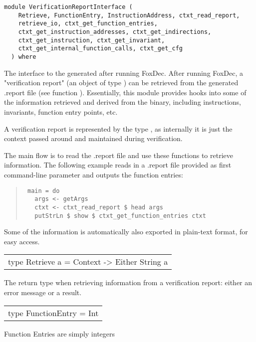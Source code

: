 \label{module:VerificationReportInterface}
\haddockbeginheader
{\haddockverb\begin{verbatim}
module VerificationReportInterface (
    Retrieve, FunctionEntry, InstructionAddress, ctxt_read_report,
    retrieve_io, ctxt_get_function_entries,
    ctxt_get_instruction_addresses, ctxt_get_indirections,
    ctxt_get_instruction, ctxt_get_invariant,
    ctxt_get_internal_function_calls, ctxt_get_cfg
  ) where\end{verbatim}}
\haddockendheader

The interface to the  generated after running FoxDec.
After running FoxDec, a "verification report" (an object of type ) can be retrieved from the generated .report file (see function ).
Essentially, this module provides hooks into some of the information retrieved and derived from the binary,
including instructions, invariants, function entry points, etc.\par
A verification report is represented by the type , as internally it
is just the context passed around and maintained during verification.\par
The main flow is to read the .report file and use these functions to retrieve information.
The following example reads in a .report file provided as first command-line parameter and outputs the function entries:\par
\begin{quote}
{\haddockverb\begin{verbatim}
 main = do
   args <- getArgs
   ctxt <- ctxt_read_report $ head args
   putStrLn $ show $ ctxt_get_function_entries ctxt\end{verbatim}}
\end{quote}
Some of the information is automatically also exported in plain-text format, for easy access.\par
\begin{haddockdesc}
\item[\begin{tabular}{@{}l}
type Retrieve a = Context -> Either String a
\end{tabular}]
{\haddockbegindoc
The return type when retrieving information from a verification report: either an error message or a result.\par}
\end{haddockdesc}
\begin{haddockdesc}
\item[\begin{tabular}{@{}l}
type FunctionEntry = Int
\end{tabular}]
{\haddockbegindoc
Function Entries are simply integers\par}
\end{haddockdesc}
